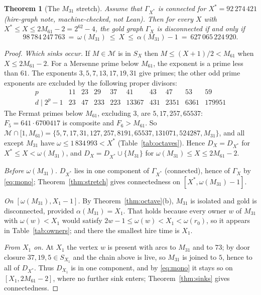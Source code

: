 \documentclass[11pt,a4paper]{article}
\newtheorem{theorem}{Theorem}[section]
\theoremstyle{remark}
\newcommand{\pow}{\mathcal{M}}   %
\begin{document}
\begin{theorem}[The \(M_{31}\) stretch]\label{thm:m31}
Assume that \(\Gamma_{X^*}\) is connected for \(X^*=92\,274\,421\) (hire-graph note, machine-checked, not Lean).
Then for every \(X\) with \(X^*\le X\le 2M_{61}-2=2^{62}-4\), the gold graph \(\Gamma_X\) is disconnected if and only if
\[
98\,784\,247\,763\ =\ \omega(M_{31})\ \le\ X\ \le\ \alpha(M_{31})-1\ =\ 627\,065\,224\,920 .
\]
\end{theorem}
\begin{proof}
\emph{Which sinks occur.}
If \(M\in\pow\) is in \(S_X\) then \(M\le (X+1)/2<M_{61}\) when \(X\le 2M_{61}-2\).
For a Mersenne prime below \(M_{61}\), the exponent is a prime less than \(61\). The exponents \(3,5,7,13,17,19,31\) give primes; the other odd prime exponents are excluded by the following proper divisors:
\[
\begin{array}{c|rrrrrrrrr}
p&11&23&29&37&41&43&47&53&59\\\hline
d\mid 2^p-1&23&47&233&223&13367&431&2351&6361&179951
\end{array}
\]
The Fermat primes below \(M_{61}\), excluding \(3\), are \(5,17,257,65537\): \(F_5=641\cdot6700417\) is composite and \(F_6>M_{61}\).
So \(\pow\cap[1,M_{61})=\{5,7,17,31,127,257,8191,65537,131071,524287,M_{31}\}\), and all except \(M_{31}\) have \(\omega\le 1\,834\,993<X^*\) (Table~\ref{tab:octaves}).
Hence \(D_X=D_{X^*}\) for \(X^*\le X<\omega(M_{31})\), and \(D_X=D_{X^*}\cup\{M_{31}\}\) for \(\omega(M_{31})\le X\le 2M_{61}-2\).

\emph{Before \(\omega(M_{31})\).}
\(D_{X^*}\) lies in one component of \(\Gamma_{X^*}\) (connected), hence of \(\Gamma_X\) by \eqref{eq:mono}; Theorem~\ref{thm:stretch} gives connectedness on \([X^*,\omega(M_{31})-1]\).

\emph{On \([\omega(M_{31}),X_1-1]\).}
By Theorem~\ref{thm:octave}(b), \(M_{31}\) is isolated and gold is disconnected, provided \(\alpha(M_{31})=X_1\).
That holds because every owner \(w\) of \(M_{31}\) with \(\omega(w)<X_1\) would satisfy \(2w-1\le\omega(w)<X_1<\omega(r_0)\), so it appears in Table~\ref{tab:owners}; and there the smallest hire time is \(X_1\).

\emph{From \(X_1\) on.}
At \(X_1\) the vertex \(w\) is present with arcs to \(M_{31}\) and to \(73\); by door closure \(37,19,5\in S_{X_1}\) and the chain above is live, so \(M_{31}\) is joined to \(5\), hence to all of \(D_{X^*}\).
Thus \(D_{X_1}\) is in one component, and by \eqref{eq:mono} it stays so on \([X_1,2M_{61}-2]\), where no further sink enters; Theorem~\ref{thm:sinks} gives connectedness.
\end{proof}
\end{document}
